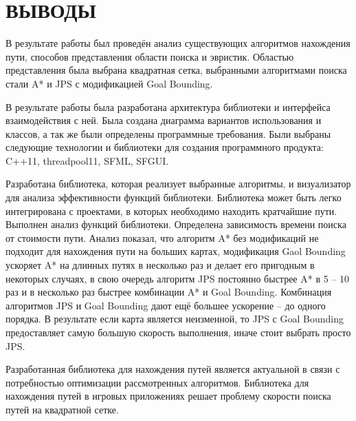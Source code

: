 \section*{ВЫВОДЫ}

\vspace{1\baselineskip} 


В результате работы был проведён анализ существующих алгоритмов нахождения пути, способов представления области поиска и эвристик. Областью представления была выбрана квадратная сетка, выбранными алгоритмами поиска стали A* и JPS с модификацией Goal Bounding.

В результате работы была разработана архитектура библиотеки и интерфейса взаимодействия с ней. Была создана диаграмма вариантов использования и классов, а так же были определены программные требования. Были выбраны следующие технологии и библиотеки для создания программного продукта: C++11, threadpool11, SFML, SFGUI.

Разработана библиотека, которая реализует выбранные алгоритмы, и визуализатор для анализа эффективности функций библиотеки. Библиотека может быть легко интегрирована с проектами, в которых необходимо находить кратчайшие пути.
Выполнен анализ функций библиотеки. Определена зависимость времени поиска от стоимости пути. Анализ показал, что алгоритм A* без модификаций не подходит для нахождения пути на больших картах, модификация Gaol Bounding ускоряет A* на длинных путях в несколько раз и делает его пригодным в некоторых случаях, в свою очередь алгоритм JPS постоянно быстрее A* в 5 -- 10 раз и в несколько раз быстрее комбинации A* и Goal Bounding. Комбинация алгоритмов JPS и Goal Bounding дают ещё большее ускорение -- до одного порядка. В результате если карта является неизменной, то JPS с Goal Bounding предоставляет самую большую скорость выполнения, иначе стоит выбрать просто JPS.

Разработанная библиотека для нахождения путей является актуальной в связи с потребностью оптимизации рассмотренных алгоритмов. Библиотека для нахождения путей в игровых приложениях решает проблему скорости поиска путей на квадратной сетке.